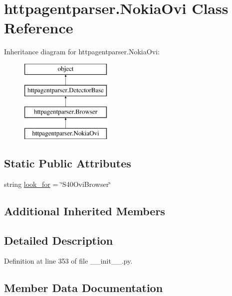 \hypertarget{classhttpagentparser_1_1_nokia_ovi}{}\section{httpagentparser.\+Nokia\+Ovi Class Reference}
\label{classhttpagentparser_1_1_nokia_ovi}
Inheritance diagram for httpagentparser.\+Nokia\+Ovi\+:\begin{figure}[H]
\begin{center}
\leavevmode
\includegraphics[height=4.000000cm]{classhttpagentparser_1_1_nokia_ovi}
\end{center}
\end{figure}
\subsection*{Static Public Attributes}
\begin{DoxyCompactItemize}
\item 
string \hyperlink{classhttpagentparser_1_1_nokia_ovi_a21daafaff28d3be25401262b320ded72}{look\+\_\+for} = \char`\"{}S40\+Ovi\+Browser\char`\"{}
\end{DoxyCompactItemize}
\subsection*{Additional Inherited Members}


\subsection{Detailed Description}


Definition at line 353 of file \+\_\+\+\_\+init\+\_\+\+\_\+.\+py.



\subsection{Member Data Documentation}
\hypertarget{classhttpagentparser_1_1_nokia_ovi_a21daafaff28d3be25401262b320ded72}{}\label{classhttpagentparser_1_1_nokia_ovi_a21daafaff28d3be25401262b320ded72} 
